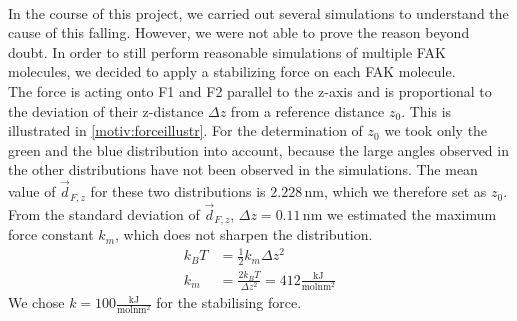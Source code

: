 \\
In the course of this project, we carried out several simulations to understand the cause of this falling. However, we were not able to prove the reason beyond doubt. In order to still perform reasonable simulations of multiple FAK molecules, we decided to apply a stabilizing force on each FAK molecule.\\
The force is acting onto F1 and F2 parallel to the z-axis and is proportional to the deviation of their z-distance $\Delta z$ from a reference distance $z_0$. This is illustrated in \autoref{motiv:forceillustr}. For the determination of $z_0$ we took only the green and the blue distribution into account, because the large angles observed in the other distributions have not been observed in the \charmm{} simulations. The mean value of $\vec{d}_{F, z}$ for these two distributions is $2.228\,\si{\nano\metre}$, which we therefore set as $z_0$. From the standard deviation of $\vec{d}_{F, z}$, $\Delta z = 0.11\,\si{\nano\metre}$ we estimated the maximum force constant $k_m$, which does not sharpen the distribution.
\begin{align}
	k_B T &= \frac{1}{2} k_m \Delta z^2\\
	k_m &= \frac{2 k_B T}{\Delta z^2} = 412 \frac{\si{\kilo\joule}}{\si{\mole} \si{\nano\metre}^2}
\end{align} 
We chose $k = 100 \frac{\si{\kilo\joule}}{\si{\mole} \si{\nano\metre}^2}$ for the stabilising force.
%
%
%
